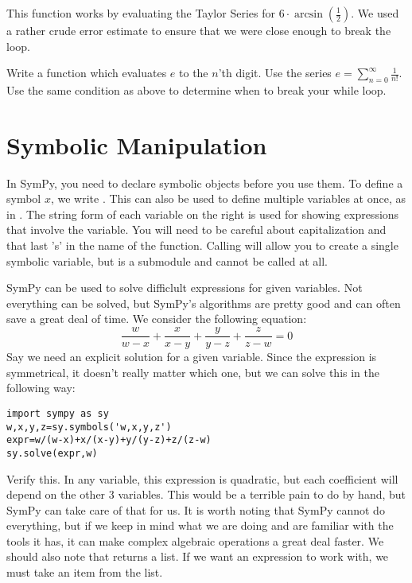 This function works by evaluating the Taylor Series for $6\cdot\arcsin\left(\frac{1}{2}\right)$.
We used a rather crude error estimate to ensure that we were close enough to break the loop.

\begin{problem}
Write a function which evaluates $e$ to the $n$'th digit.
Use the series $\displaystyle{e=\sum_{n=0}^{\infty} \frac{1}{n!}}$.
Use the same condition as above to determine when to break your while loop.
\end{problem}

\section*{Symbolic Manipulation}
In SymPy, you need to declare symbolic objects before you use them.
To define a symbol $x$, we write .
This can also be used to define multiple variables at once, as in .
The string form of each variable on the right is used for showing expressions that involve the variable.
You will need to be careful about capitalization and that last 's' in the name of the function.
Calling  will allow you to create a single symbolic variable, but  is a submodule and cannot be called at all.

SymPy can be used to solve difficlult expressions for given variables.
Not everything can be solved, but SymPy's algorithms are pretty good and can often save a great deal of time.
We consider the following equation:
$$\frac{w}{w-x}+\frac{x}{x-y}+\frac{y}{y-z}+\frac{z}{z-w}=0$$
Say we need an explicit solution for a given variable. 
Since the expression is symmetrical, it doesn't really matter which one, but we can solve this in the following way:
\begin{lstlisting}
import sympy as sy
w,x,y,z=sy.symbols('w,x,y,z')
expr=w/(w-x)+x/(x-y)+y/(y-z)+z/(z-w)
sy.solve(expr,w)
\end{lstlisting}
Verify this.
In any variable, this expression is quadratic, but each coefficient will depend on the other 3 variables.
This would be a terrible pain to do by hand, but SymPy can take care of that for us.
It is worth noting that SymPy cannot do everything, but if we keep in mind what we are doing and are familiar with the tools it has, it can make complex algebraic operations a great deal faster. 
We should also note that  returns a list.
If we want an expression to work with, we must take an item from the list.

